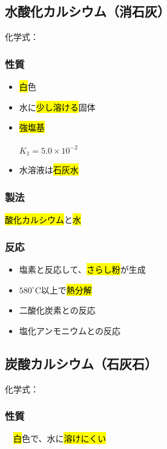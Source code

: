 \subsection{水酸化カルシウム（消石灰）}
化学式：\hl{}
\subsubsection{性質}
\begin{itemize}
  \item \hl{白}色
  \item 水に\hl{少し溶ける}固体
  \item \hl{強塩基}\\
        \hl{} \\
        \hfill $K_{1}=5.0\times10^{-2}$
  \item 水溶液は\hl{石灰水}
\end{itemize}
\subsubsection{製法}
\hl{酸化カルシウム}と\hl{水} \K\\
\subsubsection{反応}
\begin{itemize}
  \item 塩素と反応して、\hl{さらし粉}が生成\\
  \item $580^{\circ}$C以上で\hl{熱分解}\\
  \item 二酸化炭素との反応\\
  \item 塩化アンモニウムとの反応\\
\end{itemize}
\newpage
\subsection{炭酸カルシウム（石灰石）}
化学式：\hl{}
\subsubsection{性質}
　\hl{白}色で、水に\hl{溶けにくい}
